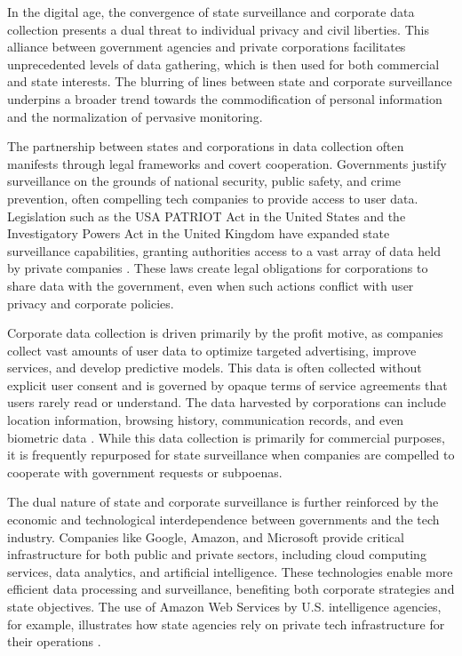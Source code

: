 \begin{refsection}
In the digital age, the convergence of state surveillance and corporate data collection presents a dual threat to individual privacy and civil liberties. This alliance between government agencies and private corporations facilitates unprecedented levels of data gathering, which is then used for both commercial and state interests. The blurring of lines between state and corporate surveillance underpins a broader trend towards the commodification of personal information and the normalization of pervasive monitoring.

The partnership between states and corporations in data collection often manifests through legal frameworks and covert cooperation. Governments justify surveillance on the grounds of national security, public safety, and crime prevention, often compelling tech companies to provide access to user data. Legislation such as the USA PATRIOT Act in the United States and the Investigatory Powers Act in the United Kingdom have expanded state surveillance capabilities, granting authorities access to a vast array of data held by private companies \cite[pp.~145-148]{greenwald2014no}. These laws create legal obligations for corporations to share data with the government, even when such actions conflict with user privacy and corporate policies.

Corporate data collection is driven primarily by the profit motive, as companies collect vast amounts of user data to optimize targeted advertising, improve services, and develop predictive models. This data is often collected without explicit user consent and is governed by opaque terms of service agreements that users rarely read or understand. The data harvested by corporations can include location information, browsing history, communication records, and even biometric data \cite[pp.~28-30]{zeynep2014engineering}. While this data collection is primarily for commercial purposes, it is frequently repurposed for state surveillance when companies are compelled to cooperate with government requests or subpoenas.

The dual nature of state and corporate surveillance is further reinforced by the economic and technological interdependence between governments and the tech industry. Companies like Google, Amazon, and Microsoft provide critical infrastructure for both public and private sectors, including cloud computing services, data analytics, and artificial intelligence. These technologies enable more efficient data processing and surveillance, benefiting both corporate strategies and state objectives. The use of Amazon Web Services by U.S. intelligence agencies, for example, illustrates how state agencies rely on private tech infrastructure for their operations \cite[pp.~212-215]{schneier2015data}.


\end{refsection}
